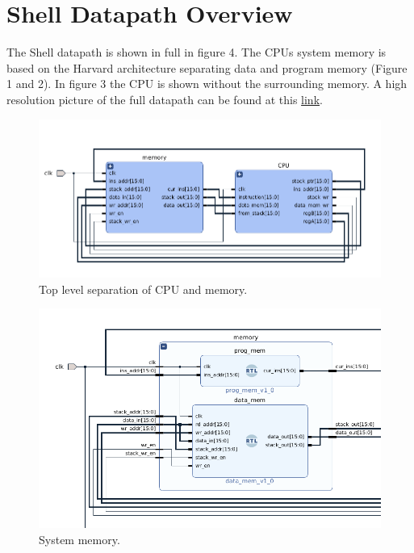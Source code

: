 \documentclass{article}
\begin{document}
\section{Shell Datapath Overview}
\label{overview}
\begin{par}
	The Shell datapath is shown in full in figure 4. The CPUs system memory is based on the Harvard architecture separating data and program memory (Figure 1 and 2). In figure 3 the CPU is shown without the surrounding memory. A high resolution picture of the full datapath can be found at this \href{https://raw.githubusercontent.com/RiceShelley/ELEC-5200/master/blockD.png}{link}.
	
	\begin{figure}[H]
		\centering
		\includegraphics[width=5in]{img/system_ov.png}
		\caption{Top level separation of CPU and memory.}
	\end{figure}

		\begin{figure}[H]
		\centering
		\includegraphics[width=6in]{img/sysmem.png}
		\caption{System memory.}
	\end{figure}
	
	\hspace{100pt}
	

\end{par}
\end{document}

